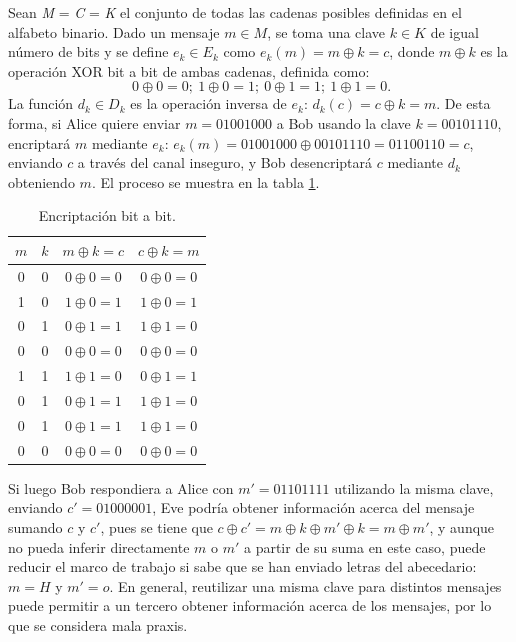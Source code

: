\begin{ejs}\label{ej:flujo_bloque_xor}
    \item Sean \textit{M} =  \textit{C} = \textit{K} el conjunto de todas las cadenas posibles definidas en el alfabeto binario. Dado un mensaje $m\in M$, se toma una clave $k\in K$ de igual número de bits y se define $e_k \in E_k$ como $e_k(m) = m \oplus k = c$, donde $m \oplus k$ es la operación XOR bit a bit de ambas cadenas, definida como:
    \[
    \ 0 \oplus 0 = 0; \ 1 \oplus 0 = 1; \ 0 \oplus 1 = 1; \ 1 \oplus 1 = 0.
    \]
   La función $d_k\in D_k$ es la operación inversa de $e_k$: $d_k(c) = c \oplus k = m$. De esta forma, si Alice quiere enviar $m = 01001000$ a Bob usando la clave $k = 00101110$, encriptará $m$ mediante $e_k$: $e_k(m) = 01001000 \oplus 00101110 = 01100110 = c$, enviando $c$ a través del canal inseguro, y Bob desencriptará $c$ mediante $d_k$ obteniendo $m$. El proceso se muestra en la tabla \ref{tab:flujo_ejemplo1}.
    
\begin{table}[H]
    \centering
    \setlength{\tabcolsep}{12pt}
    \begin{tabular}{cccc}
    \toprule
    $m$ & $k$ & $m \oplus k = c$ & $c \oplus k = m$ \\
    \midrule
     0 & 0 & $0 \oplus 0 = 0$ & $0 \oplus 0 = 0$ \\
     1 & 0 & $1 \oplus 0 = 1$ & $1 \oplus 0 = 1$ \\
     0 & 1 & $0 \oplus 1 = 1$ & $1 \oplus 1 = 0$ \\
     0 & 0 & $0 \oplus 0 = 0$ & $0 \oplus 0 = 0$ \\
     1 & 1 & $1 \oplus 1 = 0$ & $0 \oplus 1 = 1$ \\
     0 & 1 & $0 \oplus 1 = 1$ & $1 \oplus 1 = 0$ \\
     0 & 1 & $0 \oplus 1 = 1$ & $1 \oplus 1 = 0$ \\
     0 & 0 & $0 \oplus 0 = 0$ & $0 \oplus 0 = 0$ \\
    \bottomrule
    \end{tabular}
\caption{Encriptación bit a bit.}
\label{tab:flujo_ejemplo1}
\end{table}
Si luego Bob respondiera a Alice con $m' = 01101111$ utilizando la misma clave, enviando $c' = 01000001$, Eve podría obtener información acerca del mensaje sumando $c$ y $c'$, pues se tiene que $c \oplus c' = m \oplus k \oplus m' \oplus k = m \oplus m'$, y aunque no pueda inferir directamente $m$ o $m'$ a partir de su suma en este caso, puede reducir el marco de trabajo si sabe que se han enviado letras del abecedario: $m = H$ y $m'=o$. En general, reutilizar una misma clave para distintos mensajes puede permitir a un tercero obtener información acerca de los mensajes, por lo que se considera mala praxis.


\end{ejs}
